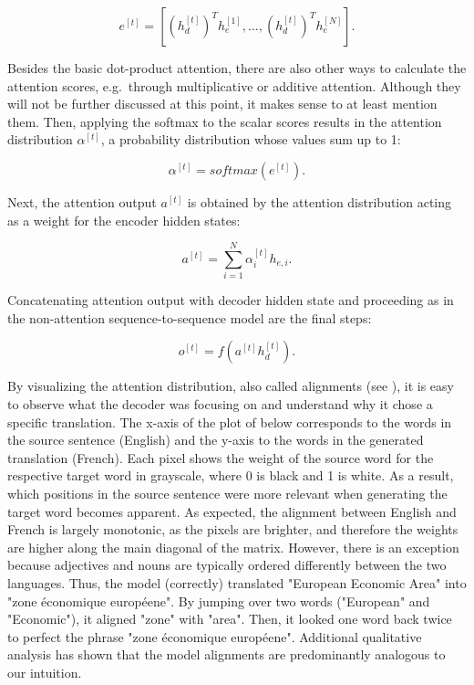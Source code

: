 \documentclass[
]{krantz}
\begin{document}
\[e^{[t]} = [(h_{d}^{[t]})^T h_{e}^{[1]}, \ldots  , (h_{d}^{[t]})^T h_{e}^{[N]} ].\]

Besides the basic dot-product attention, there are also other ways to
calculate the attention scores, e.g.~through multiplicative or additive
attention. Although they will not be further discussed at this point, it
makes sense to at least mention them. Then, applying the softmax to the
scalar scores results in the attention distribution \(\alpha^{[t]}\), a
probability distribution whose values sum up to 1:

\[\alpha^{[t]} = softmax(e^{[t]}).\]

Next, the attention output \(a^{[t]}\) is obtained by the attention
distribution acting as a weight for the encoder hidden states:

\[a^{[t]} = \sum_{i=1}^{N} \alpha_i^{[t]} h_{e,i}.\]

Concatenating attention output with decoder hidden state and proceeding
as in the non-attention sequence-to-sequence model are the final steps:

\[o^{[t]} = f(a^{[t]} h_d^{[t]}).\]

By visualizing the attention distribution, also called alignments (see
\citet{Bahdanau2014}), it is easy to observe what the decoder was focusing on
and understand why it chose a specific translation. The x-axis of the
plot of below corresponds to the words in the source sentence (English)
and the y-axis to the words in the generated translation (French). Each
pixel shows the weight of the source word for the respective target word
in grayscale, where 0 is black and 1 is white. As a result, which
positions in the source sentence were more relevant when generating the
target word becomes apparent. As expected, the alignment between English
and French is largely monotonic, as the pixels are brighter, and
therefore the weights are higher along the main diagonal of the matrix.
However, there is an exception because adjectives and nouns are
typically ordered differently between the two languages. Thus, the model
(correctly) translated "European Economic Area" into "zone économique
européene". By jumping over two words ("European" and "Economic"),
it aligned "zone" with "area". Then, it looked one word back twice
to perfect the phrase "zone économique européene". Additional
qualitative analysis has shown that the model alignments are
predominantly analogous to our intuition.\\
\end{document}
